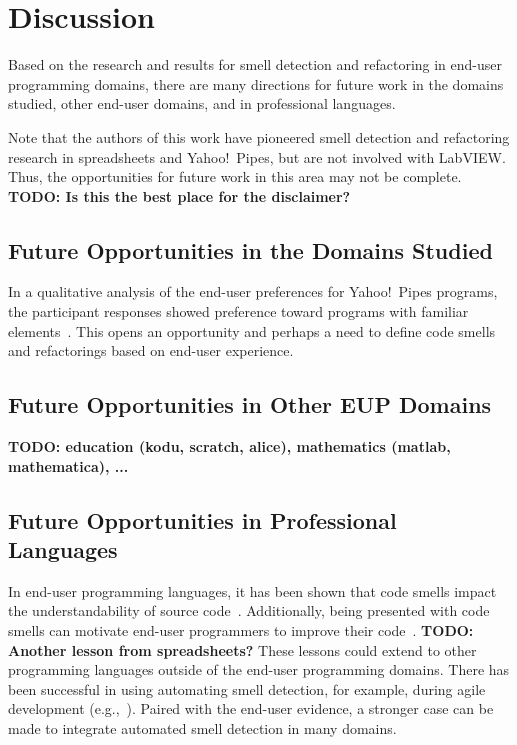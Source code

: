\documentclass[10pt,conference,compsocconf]{IEEEtran}
\newcommand{\todo}[1]{\textbf{TODO: #1}}
\begin{document}
\section{Discussion}
\label{sec:discussion}

Based on the research and results for smell detection and refactoring in end-user programming domains, there are many directions for future work in the domains studied, other end-user domains, and in professional languages. 

Note that the authors of this work have pioneered smell detection and refactoring research in spreadsheets and Yahoo!\ Pipes, but are not involved with LabVIEW. Thus, the opportunities for future work in this area may not be complete.  \todo{Is this the best place for the disclaimer?}




\subsection{Future Opportunities in the Domains Studied}
In a qualitative analysis of the end-user preferences for Yahoo!\ Pipes programs, the participant responses showed preference toward programs with familiar elements~\cite{Stolee2015}. This opens an opportunity and perhaps a need to define code smells and refactorings based on end-user experience. 

\subsection{Future Opportunities in Other EUP Domains}
\todo{education (kodu, scratch, alice), mathematics (matlab, mathematica), ...}

\subsection{Future Opportunities in Professional Languages}
In end-user programming languages, it has been shown that code smells impact the understandability of
source code~\cite{StoleeTSE2013}. Additionally, being presented with code smells can motivate end-user programmers to improve their code~\cite{chambers2013smell}. 
\todo{Another lesson from spreadsheets?}
These lessons could extend to other programming languages outside of the end-user programming domains. There has been successful in using automating smell detection, for example, during agile development (e.g.,~\cite{Schumacher:2010:BES:1852786.1852797}). Paired with the end-user evidence, a stronger case can be made to integrate automated smell detection in many domains. 
\end{document}

